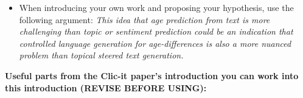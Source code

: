 

\begin{itemize}
    \item When introducing your own work and proposing your hypothesis, use the following argument: \textit{This idea that age prediction from text is more challenging than topic or sentiment prediction could be an indication that controlled language generation for age-differences is also a more nuanced problem than topical steered text generation.}
\end{itemize}

\textbf{Useful parts from the Clic-it paper's introduction you can work into this introduction (REVISE BEFORE USING):}

